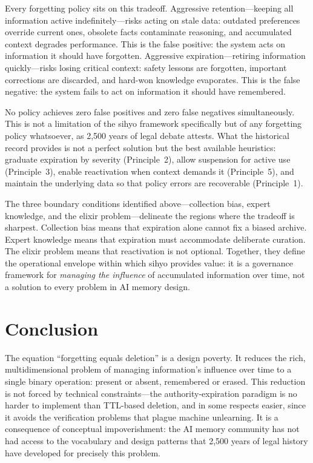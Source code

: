 \documentclass[12pt]{article}
\begin{document}
Every forgetting policy sits on this tradeoff. Aggressive retention---keeping all information active indefinitely---risks acting on stale data: outdated preferences override current ones, obsolete facts contaminate reasoning, and accumulated context degrades performance. This is the false positive: the system acts on information it should have forgotten. Aggressive expiration---retiring information quickly---risks losing critical context: safety lessons are forgotten, important corrections are discarded, and hard-won knowledge evaporates. This is the false negative: the system fails to act on information it should have remembered.

No policy achieves zero false positives and zero false negatives simultaneously. This is not a limitation of the sihyo framework specifically but of any forgetting policy whatsoever, as 2,500 years of legal debate attests. What the historical record provides is not a perfect solution but the best available heuristics: graduate expiration by severity (Principle~2), allow suspension for active use (Principle~3), enable reactivation when context demands it (Principle~5), and maintain the underlying data so that policy errors are recoverable (Principle~1).

The three boundary conditions identified above---collection bias, expert knowledge, and the elixir problem---delineate the regions where the tradeoff is sharpest. Collection bias means that expiration alone cannot fix a biased archive. Expert knowledge means that expiration must accommodate deliberate curation. The elixir problem means that reactivation is not optional. Together, they define the operational envelope within which sihyo provides value: it is a governance framework for \emph{managing the influence} of accumulated information over time, not a solution to every problem in AI memory design.

\section{Conclusion}
\label{sec:conclusion}

The equation ``forgetting equals deletion'' is a design poverty. It reduces the rich, multidimensional problem of managing information's influence over time to a single binary operation: present or absent, remembered or erased. This reduction is not forced by technical constraints---the authority-expiration paradigm is no harder to implement than TTL-based deletion, and in some respects easier, since it avoids the verification problems that plague machine unlearning. It is a consequence of conceptual impoverishment: the AI memory community has not had access to the vocabulary and design patterns that 2,500 years of legal history have developed for precisely this problem.
\end{document}
